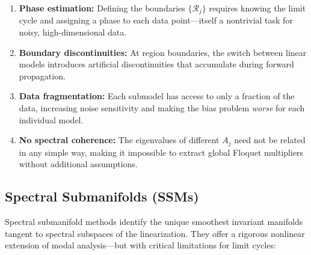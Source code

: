 \documentclass[12pt]{article}
\begin{document}
\begin{enumerate}[label=(\roman*)]
  \item \textbf{Phase estimation:} Defining the boundaries
  $\{\mathcal{R}_j\}$ requires knowing the limit cycle and assigning
  a phase to each data point---itself a nontrivial task for noisy,
  high-dimensional data.
  \item \textbf{Boundary discontinuities:} At region boundaries, the
  switch between linear models introduces artificial discontinuities
  that accumulate during forward propagation.
  \item \textbf{Data fragmentation:} Each submodel has access to only
  a fraction of the data, increasing noise sensitivity and making the
  bias problem \emph{worse} for each individual model.
  \item \textbf{No spectral coherence:} The eigenvalues of different
  $A_j$ need not be related in any simple way, making it impossible
  to extract global Floquet multipliers without additional assumptions.
\end{enumerate}

\subsection{Spectral Submanifolds (SSMs)}
\label{sec:ssm}

Spectral submanifold methods \citep{haller2016nonlinear, cenedese2022data}
identify the unique smoothest invariant manifolds tangent to spectral
subspaces of the linearization. They offer a rigorous nonlinear extension
of modal analysis---but with critical limitations for limit cycles:
\end{document}
